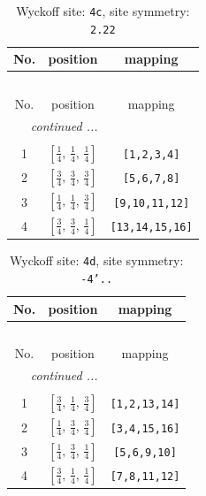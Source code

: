 \documentclass[fleqn,8pt]{jsarticle}
\begin{document}
\renewcommand{\arraystretch}{1.2}
\begin{longtable}{ccc}
\caption{Wyckoff site: {\tt 4c}, site symmetry: {\tt 2.22}}
 \\
 \hline \hline
No. & position & mapping \\ \hline \endfirsthead

\multicolumn{2}{l}{\tablename\ \thetable{}} \\
 \hline \hline
No. & position & mapping \\ \hline \endhead

 \hline \hline
\multicolumn{2}{r}{\footnotesize\it continued ...} \\ \endfoot

 \hline \hline
\multicolumn{2}{r}{} \\ \endlastfoot

1 & $\left[ \frac{1}{4},\, \frac{1}{4},\, \frac{1}{4} \right]$ & {\tt [1,2,3,4]} \\ \hline
2 & $\left[ \frac{3}{4},\, \frac{3}{4},\, \frac{3}{4} \right]$ & {\tt [5,6,7,8]} \\ \hline
3 & $\left[ \frac{1}{4},\, \frac{1}{4},\, \frac{3}{4} \right]$ & {\tt [9,10,11,12]} \\ \hline
4 & $\left[ \frac{3}{4},\, \frac{3}{4},\, \frac{1}{4} \right]$ & {\tt [13,14,15,16]} \\
\end{longtable}
\renewcommand{\arraystretch}{1.2}
\begin{longtable}{ccc}
\caption{Wyckoff site: {\tt 4d}, site symmetry: {\tt -4'..}}
 \\
 \hline \hline
No. & position & mapping \\ \hline \endfirsthead

\multicolumn{2}{l}{\tablename\ \thetable{}} \\
 \hline \hline
No. & position & mapping \\ \hline \endhead

 \hline \hline
\multicolumn{2}{r}{\footnotesize\it continued ...} \\ \endfoot

 \hline \hline
\multicolumn{2}{r}{} \\ \endlastfoot

1 & $\left[ \frac{3}{4},\, \frac{1}{4},\, \frac{3}{4} \right]$ & {\tt [1,2,13,14]} \\ \hline
2 & $\left[ \frac{1}{4},\, \frac{3}{4},\, \frac{3}{4} \right]$ & {\tt [3,4,15,16]} \\ \hline
3 & $\left[ \frac{1}{4},\, \frac{3}{4},\, \frac{1}{4} \right]$ & {\tt [5,6,9,10]} \\ \hline
4 & $\left[ \frac{3}{4},\, \frac{1}{4},\, \frac{1}{4} \right]$ & {\tt [7,8,11,12]} \\
\end{longtable}
\end{document}
